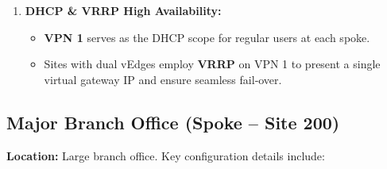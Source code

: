 \documentclass[12pt,english]{report}
\begin{document}
\begin{enumerate}
    \item \textbf{DHCP \& VRRP High Availability:}
    \begin{itemize}
        \item \textbf{VPN 1} serves as the DHCP scope for regular users at each spoke.
        \item Sites with dual vEdges employ \textbf{VRRP} on VPN 1 to present a single virtual gateway IP and ensure seamless fail‑over.
    \end{itemize}

\end{enumerate}

\subsection{Major Branch Office (Spoke – Site 200)}
\textbf{Location:} Large branch office.
Key configuration details include:
\end{document}
